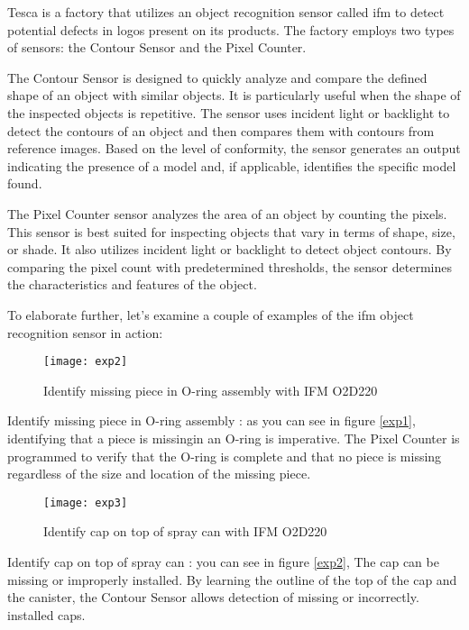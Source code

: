 \FloatBarrier
Tesca is a factory that utilizes an object recognition sensor called ifm to detect potential defects in logos present on its products. The factory employs two types of sensors: the Contour Sensor and the Pixel Counter.

The Contour Sensor is designed to quickly analyze and compare the defined shape of an object with similar objects. It is particularly useful when the shape of the inspected objects is repetitive. The sensor uses incident light or backlight to detect the contours of an object and then compares them with contours from reference images. Based on the level of conformity, the sensor generates an output indicating the presence of a model and, if applicable, identifies the specific model found.

The Pixel Counter sensor analyzes the area of an object by counting the pixels. This sensor is best suited for inspecting objects that vary in terms of shape, size, or shade. It also utilizes incident light or backlight to detect object contours. By comparing the pixel count with predetermined thresholds, the sensor determines the characteristics and features of the object.

To elaborate further, let's examine a couple of examples of the ifm object recognition sensor in action:

\FloatBarrier
\begin{figure}[h]

         \centering
        \texttt{[image: exp2]}
   
        \caption{Identify missing piece in O-ring assembly with IFM O2D220}
        \label{fig:exp1}
\FloatBarrier
    \end{figure}

\FloatBarrier
Identify missing piece in O-ring assembly :  as you can see in figure \ref{exp1}, identifying that a piece is missingin an O-ring is imperative. The Pixel Counter is programmed to verify that the O-ring is complete and that no piece is missing regardless of the size and location of the missing piece. 
\FloatBarrier
\begin{figure}[h]

         \centering
        \texttt{[image: exp3]}
   
        \caption{Identify cap on top of spray can with IFM O2D220}
        \label{fig:exp2}
\FloatBarrier
    \end{figure}

\FloatBarrier
Identify cap on top of spray can :  you can see in figure \ref{exp2}, The cap can be missing or improperly installed. By learning the outline of the top of the cap and the canister, the Contour Sensor allows detection of missing or incorrectly.
installed caps.
